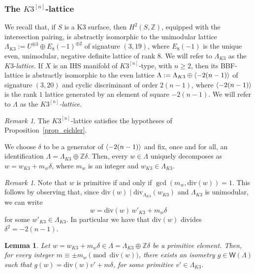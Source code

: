 \documentclass[12pt,a4paper]{amsart}
\theoremstyle{plain}
\newtheorem{lem}[thm]{Lemma}
\theoremstyle{definition}
\theoremstyle{remark}
\newtheorem{rmk}[thm]{Remark}
\def\Z{\mathbb{Z}}
\def\H{H}
\newcommand{\ZZ}{\mathbb{Z}}
\newcommand{\dv}{\mathrm{div}}
\newcommand{\W}{\mathsf{W}}
\newcommand{\kn}{K3^{[n]}}
\newcommand{\Lambdan}{{\Lambda}}
\DeclarePairedDelimiter{\brak}{\langle}{\rangle}
\begin{document}
\subsubsection{The $K3^{[n]}$-lattice}\label{sec_k3nlattice}

We recall that, if $S$ is a K3 surface, then $\H^2(S,\Z)$, equipped with the intersection pairing, is abstractly isomorphic to the unimodular lattice $\Lambda_{K3}:= U^{\oplus 3}\oplus E_8(-1)^{\oplus 2}$ of signature $(3,19)$, where $E_8(-1)$ is the unique even, unimodular, negative definite lattice of rank $8$. We will refer to $\Lambda_{K3}$ as the $K3$-\textit{lattice}. If $X$ is an IHS manifold of $K3^{[n]}$-type, with $n\geq 2$, then its BBF-lattice is abstractly isomorphic to the even lattice $\Lambdan:=\Lambda_{K3}\oplus \brak{-2(n-1)}$ of signature $(3,20)$ and cyclic discriminant of order $2(n-1)$, where $\brak{-2(n-1)}$ is the rank $1$ lattice generated by an element of square $-2(n-1)$. We will refer to $\Lambdan$ as the \textit{$\kn$-lattice}.
\begin{rmk}
    The $K3^{[n]}$-lattice satisfies the hypotheses of Proposition~\ref{prop_eichler}.
\end{rmk}
We choose $\delta$ to be a generator of $\brak{-2(n-1)}$ and fix, once and for all, an identification $\Lambdan = \Lambda_{K3} \oplus \ZZ \delta$. Then, every $w\in\Lambdan$ uniquely decomposes as $w=w_{K3}+m_w\delta$, where $m_w$ is an integer and $w_{K3}\in\Lambda_{K3}$. 
\begin{rmk}\label{rmk_primitiveimpliescoprime}
Note that $w$ is primitive if and only if $\gcd(m_w,\mathrm{div}(w))=1$. This follows by observing that, since $\mathrm{div}(w)\mid \mathrm{div}_{\Lambda_{K3}}(w_{K3})$ and $\Lambda_{K3}$ is unimodular, we can write
\[
w = \mathrm{div}(w)\, w'_{K3} + m_w \delta
\]
for some $w'_{K3}\in \Lambda_{K3}$. 
In particular we have that $\dv(w)$ divides $\delta^2=-2(n-1)$.
\end{rmk}
\begin{lem}\label{lem_latticetheory}
Let $w=w_{K3}+m_w\delta\in\Lambdan=\Lambda_{K3}\oplus\ZZ\delta$ be a primitive element. Then, for every integer $m\equiv \pm m_w \pmod{\mathrm{div}(w)}$, there exists an isometry $g\in\W(\Lambdan)$ such that $g(w)=\mathrm{div}(w)v' + m\delta$, for some primitive $v'\in\Lambda_{K3}$.
\end{lem}
\end{document}

